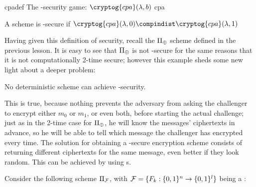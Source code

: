 \begin{cryptogame}
    {cpadef}
    {The \cpa-security game: $\cryptog{cpa}(\lambda, b)$}
    {cpa}


    \cseqbeginloop
    \cseqendloop

    \cseqdelay


    \cseqdelay

    \cseqbeginloop
    \cseqendloop

    \cseqdelay


\end{cryptogame}

\begin{definition}
    A scheme is \cpa-secure if $\cryptog{cpa}(\lambda, 0) \compindist \cryptog{cpa}(\lambda, 1)$
\end{definition}


Having given this definition of security, recall the $\Pi_{\oplus}$ scheme defined in the previous lesson. It is easy to see that $\Pi_{\oplus}$ is not \cpa-secure for the same reasons that it is not computationally 2-time secure; however this example sheds some new light about a deeper problem:

\begin{observation}
    No deterministic scheme can achieve \cpa-security.
\end{observation}

This is true, because nothing prevents the adversary from asking the challenger to encrypt either $m_0$ or $m_1$, or even both, before starting the actual challenge; just as in the 2-time case for $\Pi_{\oplus}$, he will know the messages' ciphertexts in advance, so he will be able to tell which message the challenger has encrypted every time. The solution for obtaining a \cpa-secure encryption scheme consists of returning different ciphertexts for the same message, even better if they look random. This can be achieved by using \prf{}s.

Consider the following \ske{} scheme $\Pi_{\mathcal{F}}$, with $\mathcal{F}=\{ F_{k}:\{0,1\}^{n} \to \{0,1\}^{l} \}$ being a \prf:


